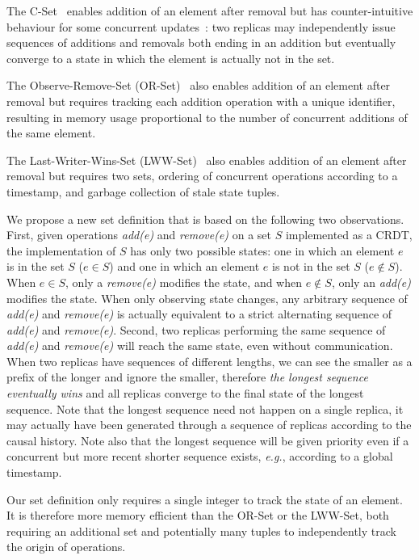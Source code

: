 \documentclass[11pt, oneside]{article}   	%
\begin{document}
The C-Set~\cite{aslan:inria-00594590} enables addition of an element after removal but has counter-intuitive behaviour for some concurrent updates~\cite{bieniusa:hal-00769554}: two replicas may independently issue sequences of additions and removals both ending in an addition but eventually converge to a state in which the element is actually not in the set.

The Observe-Remove-Set (OR-Set)~\cite{shapiro:inria-00555588} also enables addition of an element after removal but requires tracking each addition operation with a unique identifier, resulting in memory usage proportional to the number of concurrent additions of the same element.

The Last-Writer-Wins-Set (LWW-Set)~\cite{shapiro:inria-00555588} also enables addition of an element after removal but requires two sets, ordering of concurrent operations according to a timestamp, and garbage collection of stale state tuples.

We propose a new set definition that is based on the following two observations. First, given operations \textit{add(e)} and \textit{remove(e)} on a set $S$ implemented as a CRDT, the implementation of $S$ has only two possible states: one in which an element $e$ is in the set $S$ ($e \in S$) and one in which an element $e$ is not in the set $S$ ($e \notin S$). When $e \in S$, only a \textit{remove(e)} modifies the state, and when $e \notin S$, only an \textit{add(e)} modifies the state. When only observing state changes, any arbitrary sequence of \textit{add(e)} and \textit{remove(e)} is actually equivalent to a strict alternating sequence of \textit{add(e)} and \textit{remove(e)}. Second, two replicas performing the same sequence of \textit{add(e)} and \textit{remove(e)} will reach the same state, even without communication. When two replicas have sequences of different lengths, we can see the smaller as a prefix of the longer and ignore the smaller, therefore \textit{the longest sequence eventually wins} and all replicas converge to the final state of the longest sequence. Note that the longest sequence need not happen on a single replica, it may actually have been generated through a sequence of replicas according to the causal history. Note also that the longest sequence will be given priority even if a concurrent but more recent shorter sequence exists, \textit{e.g.}, according to a global timestamp.

Our set definition only requires a single integer to track the state of an element. It is therefore more memory efficient than the OR-Set or the LWW-Set, both requiring an additional set and potentially many tuples to independently track the origin of operations.
\end{document}

